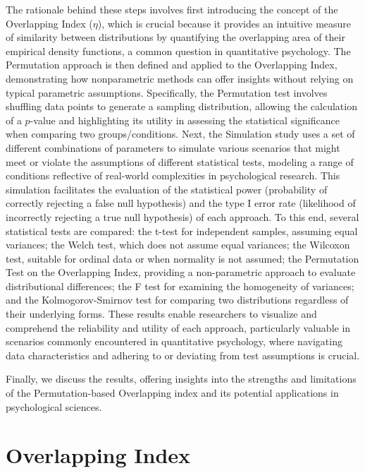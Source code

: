 \documentclass[twocolumn]{article}\usepackage[]{graphicx}\usepackage[]{xcolor}
\begin{document}
The rationale behind these steps involves first introducing the concept of the Overlapping Index ($\eta$), which is crucial because it provides an intuitive measure of similarity between distributions by quantifying the overlapping area of their empirical density functions, a common question in quantitative psychology. The Permutation approach is then defined and applied to the Overlapping Index, demonstrating how nonparametric methods can offer insights without relying on typical parametric assumptions. Specifically, the Permutation test involves shuffling data points to generate a sampling distribution, allowing the calculation of a $p$-value and highlighting its utility in assessing the statistical significance when comparing two groups/conditions. Next, the Simulation study uses a set of different combinations of parameters to simulate various scenarios that might meet or violate the assumptions of different statistical tests, modeling a range of conditions reflective of real-world complexities in psychological research. This simulation facilitates the evaluation of the statistical power (probability of correctly rejecting a false null hypothesis) and the type I error rate (likelihood of incorrectly rejecting a true null hypothesis) of each approach. To this end, several statistical tests are compared: the t-test for independent samples, assuming equal variances; the Welch test, which does not assume equal variances; the Wilcoxon test, suitable for ordinal data or when normality is not assumed; the Permutation Test on the Overlapping Index, providing a non-parametric approach to evaluate distributional differences; the F test for examining the homogeneity of variances; and the Kolmogorov-Smirnov test for comparing two distributions regardless of their underlying forms. These results enable researchers to visualize and comprehend the reliability and utility of each approach, particularly valuable in scenarios commonly encountered in quantitative psychology, where navigating data characteristics and adhering to or deviating from test assumptions is crucial.

Finally, we discuss the results, offering insights into the strengths and limitations of the Permutation-based Overlapping index and its potential applications in psychological sciences.


\section{Overlapping Index}
\end{document}
